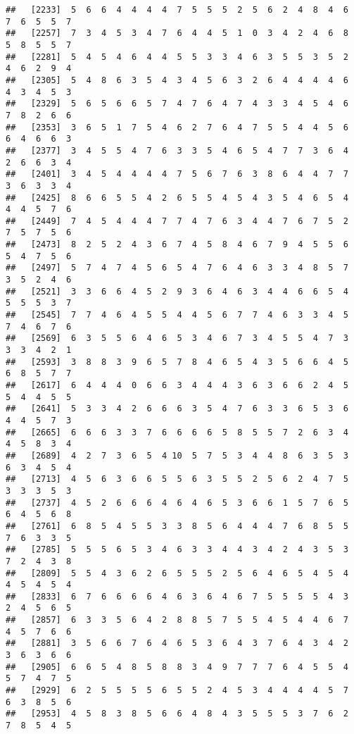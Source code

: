 \documentclass[
]{book}
\begin{document}
\begin{verbatim}
##   [2233]  5  6  6  4  4  4  4  7  5  5  5  2  5  6  2  4  8  4  6  7  6  5  5  7
##   [2257]  7  3  4  5  3  4  7  6  4  4  5  1  0  3  4  2  4  6  8  5  8  5  5  7
##   [2281]  5  4  5  4  6  4  4  5  5  3  3  4  6  3  5  5  3  5  2  4  6  2  9  4
##   [2305]  5  4  8  6  3  5  4  3  4  5  6  3  2  6  4  4  4  4  6  4  3  4  5  3
##   [2329]  5  6  5  6  6  5  7  4  7  6  4  7  4  3  3  4  5  4  6  7  8  2  6  6
##   [2353]  3  6  5  1  7  5  4  6  2  7  6  4  7  5  5  4  4  5  6  6  4  6  6  3
##   [2377]  3  4  5  5  4  7  6  3  3  5  4  6  5  4  7  7  3  6  4  2  6  6  3  4
##   [2401]  3  4  5  4  4  4  4  7  5  6  7  6  3  8  6  4  4  7  7  3  6  3  3  4
##   [2425]  8  6  6  5  5  4  2  6  5  5  4  5  4  3  5  4  6  5  4  4  4  5  7  6
##   [2449]  7  4  5  4  4  4  7  7  4  7  6  3  4  4  7  6  7  5  2  7  5  7  5  6
##   [2473]  8  2  5  2  4  3  6  7  4  5  8  4  6  7  9  4  5  5  6  5  4  7  5  6
##   [2497]  5  7  4  7  4  5  6  5  4  7  6  4  6  3  3  4  8  5  7  3  5  2  4  6
##   [2521]  3  3  6  6  4  5  2  9  3  6  4  6  3  4  4  6  6  5  4  5  5  5  3  7
##   [2545]  7  7  4  6  4  5  5  4  4  5  6  7  7  4  6  3  3  4  5  7  4  6  7  6
##   [2569]  6  3  5  5  6  4  6  5  3  4  6  7  3  4  5  5  4  7  3  3  3  4  2  1
##   [2593]  3  8  8  3  9  6  5  7  8  4  6  5  4  3  5  6  6  4  5  6  8  5  7  7
##   [2617]  6  4  4  4  0  6  6  3  4  4  4  3  6  3  6  6  2  4  5  5  4  4  5  5
##   [2641]  5  3  3  4  2  6  6  6  3  5  4  7  6  3  3  6  5  3  6  4  4  5  7  3
##   [2665]  6  6  6  3  3  7  6  6  6  6  5  8  5  5  7  2  6  3  4  4  5  8  3  4
##   [2689]  4  2  7  3  6  5  4 10  5  7  5  3  4  4  8  6  3  5  3  6  3  4  5  4
##   [2713]  4  5  6  3  6  6  5  5  6  3  5  5  2  5  6  2  4  7  5  3  3  3  5  3
##   [2737]  4  5  2  6  6  6  4  6  4  6  5  3  6  6  1  5  7  6  5  6  4  5  6  8
##   [2761]  6  8  5  4  5  5  3  3  8  5  6  4  4  4  7  6  8  5  5  7  6  3  3  5
##   [2785]  5  5  5  6  5  3  4  6  3  3  4  4  3  4  2  4  3  5  3  7  2  4  3  8
##   [2809]  5  5  4  3  6  2  6  5  5  5  2  5  6  4  6  5  4  5  4  4  5  4  5  4
##   [2833]  6  7  6  6  6  6  4  6  3  6  4  6  7  5  5  5  5  4  3  2  4  5  6  5
##   [2857]  6  3  3  5  6  4  2  8  8  5  7  5  5  4  5  4  4  6  7  4  5  7  6  6
##   [2881]  3  5  6  6  7  6  4  6  5  3  6  4  3  7  6  4  3  4  2  3  6  3  6  6
##   [2905]  6  6  5  4  8  5  8  8  3  4  9  7  7  7  6  4  5  5  4  5  7  4  7  5
##   [2929]  6  2  5  5  5  5  6  5  5  2  4  5  3  4  4  4  4  5  7  6  3  8  5  6
##   [2953]  4  5  8  3  8  5  6  6  4  8  4  3  5  5  5  3  7  6  2  7  8  5  4  5

\end{verbatim}
\end{document}
